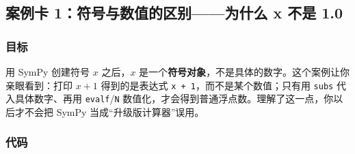 \begin{Shaded}
\begin{Highlighting}[]
\end{Highlighting}
\end{Shaded}

\subsection{案例卡 1：符号与数值的区别------为什么 x 不是
1.0}\label{ux6848ux4f8bux5361-1ux7b26ux53f7ux4e0eux6570ux503cux7684ux533aux522bux4e3aux4ec0ux4e48-x-ux4e0dux662f-1.0}

\subsubsection{目标}\label{ux76eeux6807-11}

用 SymPy 创建符号 \(x\) 之后，\(x\)
是一个\textbf{符号对象}，不是具体的数字。这个案例让你亲眼看到：打印
\(x+1\) 得到的是表达式 \texttt{x\ +\ 1}，而不是某个数值；只有用
\texttt{subs} 代入具体数字、再用 \texttt{evalf}/\texttt{N}
数值化，才会得到普通浮点数。理解了这一点，你以后才不会把 SymPy
当成``升级版计算器''误用。

\subsubsection{代码}\label{ux4ee3ux7801-11}

